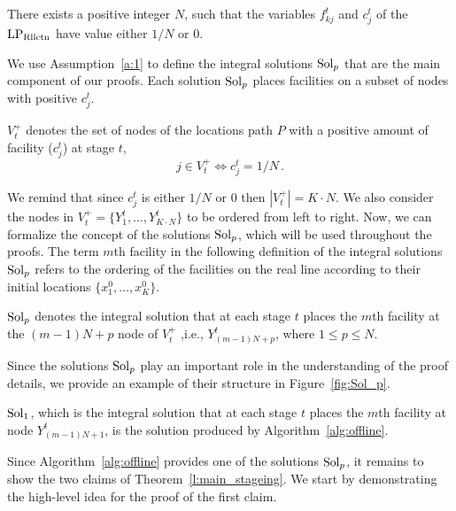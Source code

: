 \begin{assumption}\label{a:1}
There exists a positive integer $N$, such that the  variables $f_{kj}^t$ and $c_j^t$ of the $\mathrm{LP_{\mathrm{Rllctn}}}$ have value either $1/N$ or $0$.
\end{assumption}
\noindent

We use Assumption~\ref{a:1} to define the integral solutions $\mathrm{Sol}_p$ that are the main component of our proofs. Each solution $\mathrm{Sol}_p$ places facilities on a subset of nodes with positive $c_j^t$.

\begin{definition}\label{d:positive}
$V_t^{+}$ denotes the set of nodes of the locations path $P$ with a positive amount of facility 
($c_j^t$) at stage $t$,
\[j \in V_{t}^+ \iff c_j^t = 1/N \,.\]
\end{definition}

\noindent We remind that since $c_j^t$ is either  $1/N$ or $0$ then $|V_t^+| = K \cdot N$. We 
also consider the nodes in $V_t^{+} = \{Y_1^t,\ldots,Y_{K \cdot N}^t\}$ to be 
ordered from left to right. Now, we can formalize the concept of the solutions $\mathrm{Sol}_p$, which will be used throughout the proofs. The term $m$th facility in the following definition of the integral solutions $\mathrm{Sol}_p$ refers to the ordering of the facilities on the real line according to their initial locations $\{x_1^0, \ldots ,x_K^0 \}$.

\begin{definition}\label{def:Sol_p}
$\mathrm{Sol}_p$ denotes the integral solution that at each stage $t$ places the $m$th facility 
at the $(m-1)N + p$ node of $V_t^+$
,i.e., $Y_{(m-1)N + p}^t$, where $1\leq p \leq N$. 
\end{definition}

\noindent Since the solutions $\mathrm{Sol}_p$ play an important role in the understanding of the proof details, we provide an example of their structure in Figure~\ref{fig:Sol_p}. 

\begin{observation}\label{o:sol_1}
$\mathrm{Sol}_1$, which is the integral solution that at each stage $t$ places the $m$th facility 
at node $Y_{(m-1)N + 1}^t$, is the solution produced by Algorithm~\ref{alg:offline}.
\end{observation}

Since Algorithm~\ref{alg:offline} provides one of the solutions $\mathrm{Sol}_p$, it remains to show the two claims of Theorem~\ref{l:main_stageing}. We start by demonstrating the high-level idea for the proof of the first claim.

